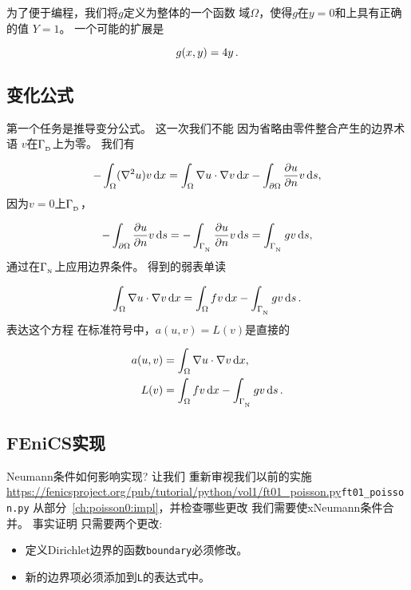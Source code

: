 为了便于编程，我们将$g$定义为整体的一个函数
域$\Omega$，使得$g$在$y=0$和上具有正确的值
$Y=1$。 一个可能的扩展是

\begin{equation*}
g(x,y) = 4y\tp
\end{equation*}

\subsection{变化公式}

第一个任务是推导变分公式。 这一次我们不能
因为省略由零件整合产生的边界术语
$v$在$\GD$上为零。 我们有

\begin{equation*}
 -\int_\Omega (\nabla^2 u)v \dx
= \int_\Omega\nabla u\cdot\nabla v \dx - \int_{\partial\Omega}{\partial u\over
\partial n}v \ds,
\end{equation*}
因为$v=0$上$\GD$，

\begin{equation*}
- \int_{\partial\Omega}{\partial u\over
\partial n}v \ds
=
- \int_{\GN}{\partial u\over
\partial n}v \ds
= \int_{\GN}gv \ds,
\end{equation*}
通过在$\GN$上应用边界条件。
得到的弱表单读

\begin{equation}
\int_{\Omega} \nabla u \cdot \nabla v \dx
= \int_{\Omega} fv \dx - \int_{\GN} gv \ds\tp
\label{ch:poisson0:2D:DN:weak}
\end{equation}
表达这个方程
在标准符号中，$a(u,v)=L(v)$是直接的

\begin{align}
a(u, v) &= \int_{\Omega} \nabla u \cdot \nabla v \dx,
\label{ftut:poisson2:vard:a}\\
L(v) &= \int_{\Omega} fv \dx -
\int_{\GN} gv \ds\tp  \label{ftut:poisson2:vard:L}
\end{align}

\subsection{FEniCS实现}

Neumann条件如何影响实现? 让我们
重新审视我们以前的实施
\url{https://fenicsproject.org/pub/tutorial/python/vol1/ft01_poisson.py}{\nolinkurl{ft01_poisson.py}}
从部分~\ref{ch:poisson0:impl}，并检查哪些更改
我们需要使xNeumann条件合并。 事实证明
只需要两个更改:

\begin{itemize}
  \item 定义Dirichlet边界的函数\texttt{boundary}必须修改。

  \item 新的边界项必须添加到\texttt{L}的表达式中。
\end{itemize}

